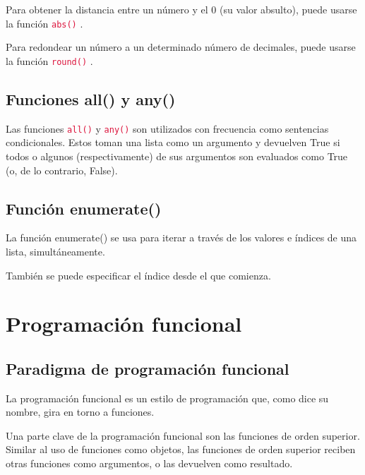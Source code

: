 \documentclass{report}
\newcommand{\ttt}[1]{
  \textcolor{Crimson}{\texttt{#1}}
}
\begin{document}

Para obtener la distancia entre un número y el 0 (su valor absulto), puede usarse la función \ttt{abs()}.


Para redondear un número a un determinado número de decimales, puede usarse la función \ttt{round()}.


\section{Funciones all() y any()}

Las funciones \ttt{all()} y \ttt{any()} son utilizados con frecuencia como sentencias condicionales. Estos toman una lista como un argumento y devuelven True si todos o algunos (respectivamente) de sus argumentos son evaluados como True (o, de lo contrario, False).



\section{Función enumerate()}

La función enumerate() se usa para iterar a través de los valores e índices de una lista, simultáneamente.


También se puede especificar el índice desde el que comienza.


\clearpage\chapter{Programación funcional}

\section{Paradigma de programación funcional}

La programación funcional es un estilo de programación que, como dice su nombre, gira en torno a funciones.\smallskip

Una parte clave de la programación funcional son las funciones de orden superior. Similar al uso de funciones como objetos, las funciones de orden superior reciben otras funciones como argumentos, o las devuelven como resultado.
\end{document}
